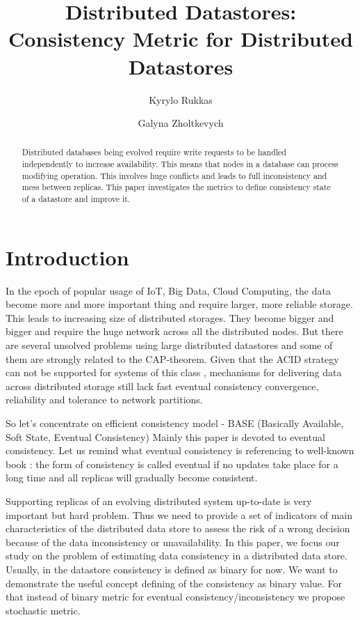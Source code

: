 \documentclass{llncs}
\begin{document}
\title{Distributed Datastores: Consistency Metric for Distributed Datastores}
\author{Kyrylo Rukkas\and Galyna Zholtkevych}
\maketitle
\begin{abstract}
Distributed databases being evolved require write requests to be handled independently to increase availability.
This means that nodes in a database can process modifying operation. This involves huge conflicts and leads to
full inconsistency and mess between replicas. This paper investigates the metrics to define consistency state of a datastore and improve it.
\end{abstract}

\section{Introduction}\label{sec:intro}
In the epoch of popular usage of IoT, Big Data, Cloud Computing, the data become more and more important thing and require larger, more reliable storage. This leads to increasing size of distributed storages. They become bigger and bigger and require the huge network across all the distributed nodes.
But there are several unsolved problems using large distributed datastores and some of them are strongly related to the CAP-theorem. 
Given that the ACID strategy can not be supported for systems of this class \cite{bib:brewer}, mechanisms for delivering data across distributed storage still lack fast eventual consistency convergence, reliability and tolerance to network partitions.

So let's concentrate on efficient consistency model - BASE (Basically Available, Soft State, Eventual Consistency) \cite{bib:acid_vs_base}
Mainly this paper is devoted to eventual consistency. Let us remind what eventual consistency is referencing to well-known book \cite{bib:tanenbaum}: the form of consistency is called eventual if no updates take place for a long time and all replicas will gradually become consistent.

Supporting replicas of an evolving distributed system up-to-date is very important but hard problem. Thus we need to provide a set of indicators of main characteristics of the distributed data store to assess the risk of a wrong decision because of the data inconsistency or unavailability.
In this paper, we focus our study on the problem of estimating data consistency in a distributed data store. Usually, in the datastore consistency is defined as binary for now. We want to demonstrate the useful concept defining of the consistency as binary value. 
For that instead of binary metric for eventual consistency/inconsistency we propose stochastic metric.
\end{document}
